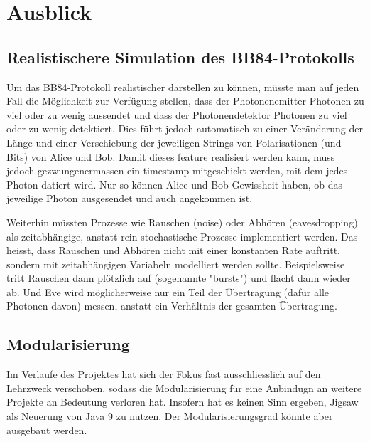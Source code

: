 \documentclass[a4paper,10.2pt,pdftex]{scrartcl}%
\begin{document}
\section{Ausblick}
\subsection{ Realistischere Simulation des BB84-Protokolls}

Um das BB84-Protokoll realistischer darstellen zu können, müsste man auf jeden Fall die Möglichkeit zur Verfügung stellen, dass der Photonenemitter Photonen zu viel oder zu wenig aussendet und dass der Photonendetektor Photonen zu viel oder zu wenig detektiert. Dies führt jedoch automatisch zu einer Veränderung der Länge und einer Verschiebung der jeweiligen Strings von Polarisationen (und Bits) von Alice und Bob. Damit dieses feature realisiert werden kann, muss jedoch gezwungenermassen ein timestamp mitgeschickt werden, mit dem jedes Photon datiert wird. Nur so können Alice und Bob Gewissheit haben, ob das jeweilige Photon ausgesendet und auch angekommen ist.

Weiterhin müssten Prozesse wie Rauschen (noise) oder Abhören (eavesdropping) als zeitabhängige, anstatt rein stochastische Prozesse implementiert werden. Das heisst, dass Rauschen und Abhören nicht mit einer konstanten Rate auftritt, sondern mit zeitabhängigen Variabeln modelliert werden sollte. Beispielsweise tritt Rauschen dann plötzlich auf (sogenannte "bursts") und flacht dann wieder ab. Und Eve wird möglicherweise nur ein Teil der Übertragung (dafür alle Photonen davon) messen, anstatt ein Verhältnis der gesamten Übertragung.

\subsection{Modularisierung}
Im Verlaufe des Projektes hat sich der Fokus fast ausschliesslich auf den Lehrzweck verschoben, sodass die Modularisierung für eine Anbindugn an weitere Projekte an Bedeutung verloren hat. Insofern hat es keinen Sinn ergeben, Jigsaw als Neuerung von Java 9 zu nutzen. Der Modularisierungsgrad könnte aber ausgebaut werden. 
\end{document}
